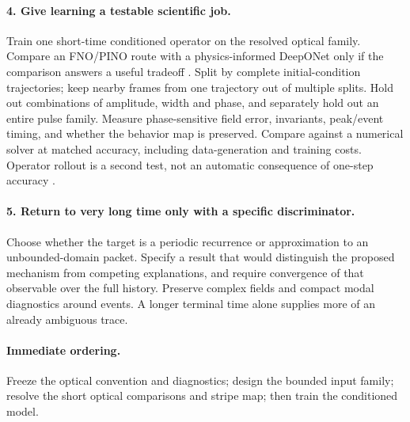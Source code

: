 \documentclass[11pt]{article}
\begin{document}
\paragraph{4. Give learning a testable scientific job.}
Train one short-time conditioned operator on the resolved optical family. Compare an FNO/PINO route with a physics-informed DeepONet only if the comparison answers a useful tradeoff \cite{PINO,DeepONet}. Split by complete initial-condition trajectories; keep nearby frames from one trajectory out of multiple splits. Hold out combinations of amplitude, width and phase, and separately hold out an entire pulse family. Measure phase-sensitive field error, invariants, peak/event timing, and whether the behavior map is preserved. Compare against a numerical solver at matched accuracy, including data-generation and training costs. Operator rollout is a second test, not an automatic consequence of one-step accuracy \cite{LongOperator}.

\paragraph{5. Return to very long time only with a specific discriminator.}
Choose whether the target is a periodic recurrence or approximation to an unbounded-domain packet. Specify a result that would distinguish the proposed mechanism from competing explanations, and require convergence of that observable over the full history. Preserve complex fields and compact modal diagnostics around events. A longer terminal time alone supplies more of an already ambiguous trace.

\paragraph{Immediate ordering.}
Freeze the optical convention and diagnostics; design the bounded input family; resolve the short optical comparisons and stripe map; then train the conditioned model.

\newpage
\end{document}
